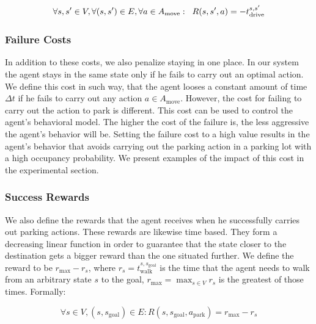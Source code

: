 \begin{equation}
\label{eq:drive_reward}
\forall s,s' \in V, \forall (s, s') \in E, \forall a \in A_{\mathrm{move}}: \hspace{2mm} R(s, s', a) = -t_{\mathrm{drive}}^{s,s'}
\end{equation}

\subsubsection{Failure Costs} %
\label{ssub:failure_costs}

In addition to these costs, we also penalize staying in one place. In our
system the agent stays in the same state only if he fails to carry out an
optimal action. We define this cost in such way, that the agent looses a
constant amount of time $\Delta t$ if he fails to carry out any action $a \in
A_\mathrm{move}$. However, the cost for failing to carry out the action to
park is different. This cost can be used to control the agent's behavioral
model. The higher the cost of the failure is, the less aggressive the agent's
behavior will be. Setting the failure cost to a high value results in the
agent's behavior that avoids carrying out the parking action in a parking lot
with a high occupancy probability. We present examples of the impact of this
cost in the experimental section.


\subsubsection{Success Rewards} %
\label{ssub:success_rewards}

We also define the rewards that the agent receives when he successfully
carries out parking actions. These rewards are likewise time based. They form
a decreasing linear function in order to guarantee that the state closer to
the destination gets a bigger reward than the one situated further. We define
the reward to be $r_{\max} - r_s$, where $r_s =
t_{\mathrm{walk}}^{s,s_{\mathrm{goal}}}$ is the time that the agent needs to
walk from an arbitrary state $s$ to the goal, $r_{\max} = \max_{s \in V}r_s$
is the greatest of those times. Formally:

\begin{equation}
\label{eq:park_reward}
\forall s \in V, (s, s_{\mathrm{goal}}) \in E : R(s, s_{\mathrm{goal}}, a_{\mathrm{park}}) = r_{\max} - r_s
\end{equation}

